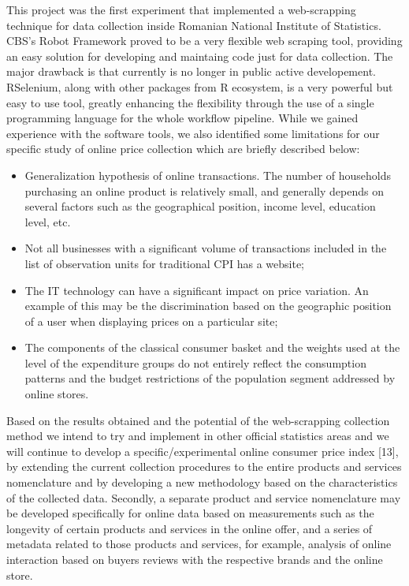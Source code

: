 \documentclass[]{article}
\begin{document}
This project was the first experiment that implemented a web-scrapping technique for data collection 
inside Romanian National Institute of Statistics. CBS's Robot Framework proved to be a very flexible web scraping tool, providing an easy solution
for developing and maintaing code just for data collection. The major drawback is that currently is no longer
in public active developement. RSelenium, along with other packages from R ecosystem, is a very powerful but easy to 
use tool, greatly enhancing the flexibility through the use of a single programming language for the whole workflow pipeline.  
While we gained experience with the software tools, we also 
identified some limitations for our specific study of online price collection which are briefly described below:
\begin{itemize}
\item Generalization hypothesis of online transactions. The number of households purchasing an 
online product is relatively small, and generally depends on several factors such as the geographical position, 
income level, education level, etc.
\item Not all businesses with a significant volume of transactions included in the list of observation 
units for traditional CPI has a website;
\item The IT technology can have a significant impact on price variation. An example of this may be the discrimination 
based on the geographic position of a user when displaying prices on a particular site;
\item The components of the classical consumer basket and the weights used at the level of the expenditure groups do not 
entirely reflect the consumption patterns and the budget restrictions of the population segment addressed by online stores.
\end{itemize}


Based on the results obtained and the potential of the web-scrapping collection method we intend to try and implement 
in other official statistics areas and we will continue to develop a specific/experimental online consumer price index [13], 
by extending the current collection procedures to the entire products and services nomenclature and by 
developing a new methodology based on the characteristics of the collected data. Secondly, a separate product and service nomenclature may 
be developed specifically for online data based on measurements such as the longevity of certain products 
and services in the online offer, and a series of metadata related to those products and services, for example, analysis of 
online interaction based on buyers reviews with the respective brands and the online store.
\end{document}
